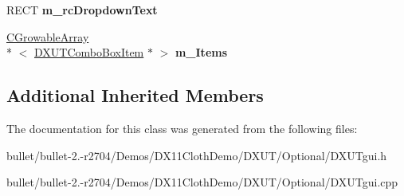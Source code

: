 \begin{DoxyCompactItemize}
\item 
\hypertarget{class_c_d_x_u_t_combo_box_a7e48109d7bcd08b41a2ebfa2b69a5b92}{R\+E\+C\+T {\bfseries m\+\_\+rc\+Dropdown\+Text}}\label{class_c_d_x_u_t_combo_box_a7e48109d7bcd08b41a2ebfa2b69a5b92}

\item 
\hypertarget{class_c_d_x_u_t_combo_box_a3c0b747c27282edfbeb1c47fc7a1ece6}{\hyperlink{class_c_growable_array}{C\+Growable\+Array}\\*
$<$ \hyperlink{struct_d_x_u_t_combo_box_item}{D\+X\+U\+T\+Combo\+Box\+Item} $\ast$ $>$ {\bfseries m\+\_\+\+Items}}\label{class_c_d_x_u_t_combo_box_a3c0b747c27282edfbeb1c47fc7a1ece6}

\end{DoxyCompactItemize}
\subsection*{Additional Inherited Members}


The documentation for this class was generated from the following files\+:\begin{DoxyCompactItemize}
\item 
bullet/bullet-\/2.-\/r2704/\+Demos/\+D\+X11\+Cloth\+Demo/\+D\+X\+U\+T/\+Optional/D\+X\+U\+Tgui.\+h\item 
bullet/bullet-\/2.-\/r2704/\+Demos/\+D\+X11\+Cloth\+Demo/\+D\+X\+U\+T/\+Optional/D\+X\+U\+Tgui.\+cpp\end{DoxyCompactItemize}
